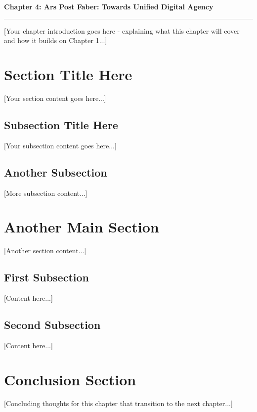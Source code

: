 \clearpage


\setcounter{chapter}{2}
\setcounter{section}{0}


\pagestyle{fancy}
\fancyhf{} %
\fancyfoot[C]{\thepage} %
\renewcommand{\headrulewidth}{0pt}
\renewcommand{\footrulewidth}{0pt}

\noindent
{\Large\textbf{Chapter 4: Ars Post Faber: Towards Unified Digital Agency}}
\vspace{0.3cm}
\hrule
\vspace{0.8cm}
\label{ch:democratization}

\setlength{\parindent}{0pt}

[Your chapter introduction goes here - explaining what this chapter will cover and how it builds on Chapter 1...]

\section{Section Title Here}

[Your section content goes here...]

\subsection{Subsection Title Here}

[Your subsection content goes here...]

\subsection{Another Subsection}

[More subsection content...]

\section{Another Main Section}

[Another section content...]

\subsection{First Subsection}

[Content here...]

\subsection{Second Subsection}

[Content here...]

\section{Conclusion Section}

[Concluding thoughts for this chapter that transition to the next chapter...]